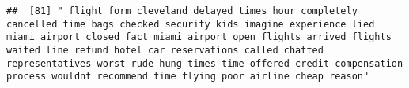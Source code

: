 \documentclass[
]{article}
\begin{document}
\begin{verbatim}
##  [81] " flight form cleveland delayed times hour completely cancelled time bags checked security kids imagine experience lied miami airport closed fact miami airport open flights arrived flights waited line refund hotel car reservations called chatted representatives worst rude hung times time offered credit compensation process wouldnt recommend time flying poor airline cheap reason"                                                                                                                                                                                                                                                                                                                                                                                                                                                                                                                                                                                                                                                                                                                                                                                                                                                                                                                                                                                                                                                                                                                                                                                                                                                                                                                                                                                                   

\end{verbatim}
\end{document}
